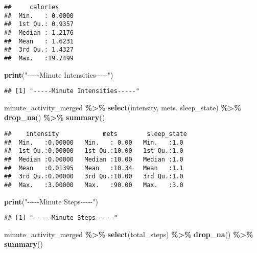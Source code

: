 \documentclass[
]{article}
\newenvironment{Shaded}{\begin{snugshade}}{\end{snugshade}}
\newcommand{\FunctionTok}[1]{\textcolor[rgb]{0.13,0.29,0.53}{\textbf{#1}}}
\newcommand{\NormalTok}[1]{#1}
\newcommand{\SpecialCharTok}[1]{\textcolor[rgb]{0.81,0.36,0.00}{\textbf{#1}}}
\newcommand{\StringTok}[1]{\textcolor[rgb]{0.31,0.60,0.02}{#1}}
\begin{document}
\begin{verbatim}
##     calories      
##  Min.   : 0.0000  
##  1st Qu.: 0.9357  
##  Median : 1.2176  
##  Mean   : 1.6231  
##  3rd Qu.: 1.4327  
##  Max.   :19.7499
\end{verbatim}

\begin{Shaded}
\begin{Highlighting}[]
\FunctionTok{print}\NormalTok{(}\StringTok{"{-}{-}{-}{-}{-}Minute Intensities{-}{-}{-}{-}{-}"}\NormalTok{)}
\end{Highlighting}
\end{Shaded}

\begin{verbatim}
## [1] "-----Minute Intensities-----"
\end{verbatim}

\begin{Shaded}
\begin{Highlighting}[]
\NormalTok{minute\_activity\_merged }\SpecialCharTok{\%\textgreater{}\%} 
  \FunctionTok{select}\NormalTok{(intensity, mets, sleep\_state) }\SpecialCharTok{\%\textgreater{}\%} 
  \FunctionTok{drop\_na}\NormalTok{() }\SpecialCharTok{\%\textgreater{}\%} 
  \FunctionTok{summary}\NormalTok{()}
\end{Highlighting}
\end{Shaded}

\begin{verbatim}
##    intensity            mets        sleep_state 
##  Min.   :0.00000   Min.   : 0.00   Min.   :1.0  
##  1st Qu.:0.00000   1st Qu.:10.00   1st Qu.:1.0  
##  Median :0.00000   Median :10.00   Median :1.0  
##  Mean   :0.01395   Mean   :10.34   Mean   :1.1  
##  3rd Qu.:0.00000   3rd Qu.:10.00   3rd Qu.:1.0  
##  Max.   :3.00000   Max.   :90.00   Max.   :3.0
\end{verbatim}

\begin{Shaded}
\begin{Highlighting}[]
\FunctionTok{print}\NormalTok{(}\StringTok{"{-}{-}{-}{-}{-}Minute Steps{-}{-}{-}{-}{-}"}\NormalTok{)}
\end{Highlighting}
\end{Shaded}

\begin{verbatim}
## [1] "-----Minute Steps-----"
\end{verbatim}

\begin{Shaded}
\begin{Highlighting}[]
\NormalTok{minute\_activity\_merged }\SpecialCharTok{\%\textgreater{}\%} 
  \FunctionTok{select}\NormalTok{(total\_steps) }\SpecialCharTok{\%\textgreater{}\%} 
  \FunctionTok{drop\_na}\NormalTok{() }\SpecialCharTok{\%\textgreater{}\%} 
  \FunctionTok{summary}\NormalTok{()}
\end{Highlighting}
\end{Shaded}
\end{document}

